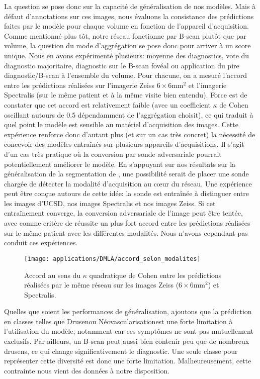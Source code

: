 La question se pose donc sur la capacité de généralisation de nos modèles. Mais à défaut d'annotations sur ces images, nous évaluons la consistance des prédictions faites par le modèle pour chaque volume en fonction de l'appareil d'acquisition. Comme mentionné plus tôt, notre réseau fonctionne par B-scan plutôt que par volume, la question du mode d'aggrégation se pose donc pour arriver à un score unique. Nous en avons expérimenté plusieurs: moyenne des diagnostics, vote du diagnostic majoritaire, diagnostic sur le B-scan fovéal ou application du pire diagnostic/B-scan à l'ensemble du volume. Pour chacune, on a mesuré l'accord entre les prédictions réalisées sur l'imagerie Zeiss $6\times6$mm$^2$ et l'imagerie Spectralis (sur le même patient et à la même visite bien entendu). Force est de constater que cet accord est relativement faible (avec un coefficient $\kappa$ de Cohen oscillant autours de 0.5 dépendamment de l'aggrégation choisit), ce qui traduit à quel point le modèle est sensible au matériel d'acquisition des images. Cette expérience renforce donc d'autant plus (et sur un cas très concret) la nécessité de concevoir des modèles entraînés sur plusieurs appareils d'acquisitions. Il s'agit d'un cas très pratique où la conversion par sonde adversariale pourrait potentiellement améliorer le modèle. En s'appuyant sur nos résultats sur la généralisation de la segmentation de \fundus{}, une possibilité serait de placer une sonde chargée de détecter la modalité d'acquisition au c\oe{}ur du réseau. Une expérience peut être conçue autours de cette idée: la sonde est entraînée à distinguer entre les images d'UCSD, nos images Spectralis et nos images Zeiss. Si cet entraînement converge, la conversion adversariale de l'image peut être tentée, avec comme critère de réussite un plus fort accord entre les prédictions réalisées sur le même patient avec les différentes modalités. Nous n'avons cependant pas conduit ces expériences.

\begin{figure}[H]
	\centering
	\texttt{[image: applications/DMLA/accord\_selon\_modalites]}
	\caption{Accord au sens du $\kappa$ quadratique de Cohen entre les prédictions réalisées par le même réseau sur les images Zeiss ($6\times 6$mm$^2$) et Spectralis.}
	\label{fig:DMLA_accord_model_zeiss_spectralis}
\end{figure}
Quelles que soient les performances de généralisation, ajoutons que la prédiction en classes telles que \og Drusen\fg ou \og Néovascularisation\fg est une forte limitation à l'utilisation du modèle, notamment car ces symptômes ne sont pas mutuellement exclusifs. Par ailleurs, un B-scan peut aussi bien contenir peu que de nombreux drusens, ce qui change significativement le diagnostic. Une seule classe pour représenter cette diversité est donc une forte limitation. Malheureusement, cette contrainte nous vient des données à notre disposition.


